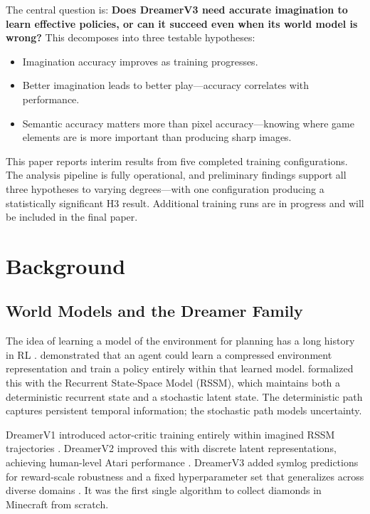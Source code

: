 \documentclass[letterpaper]{article}
\begin{document}
The central question is: \textbf{Does DreamerV3 need accurate imagination to learn effective policies, or can it succeed even when its world model is wrong?} This decomposes into three testable hypotheses:
\begin{itemize}
    \item[\textbf{H1:}] Imagination accuracy improves as training progresses.
    \item[\textbf{H2:}] Better imagination leads to better play---accuracy correlates with performance.
    \item[\textbf{H3:}] Semantic accuracy matters more than pixel accuracy---knowing where game elements are is more important than producing sharp images.
\end{itemize}

This paper reports interim results from five completed training configurations. The analysis pipeline is fully operational, and preliminary findings support all three hypotheses to varying degrees---with one configuration producing a statistically significant H3 result. Additional training runs are in progress and will be included in the final paper.


\section{Background}

\subsection{World Models and the Dreamer Family}

The idea of learning a model of the environment for planning has a long history in RL \citep{sutton2018rl}. \citet{ha2018world} demonstrated that an agent could learn a compressed environment representation and train a policy entirely within that learned model. \citet{hafner2019planet} formalized this with the Recurrent State-Space Model (RSSM), which maintains both a deterministic recurrent state and a stochastic latent state. The deterministic path captures persistent temporal information; the stochastic path models uncertainty.

DreamerV1 introduced actor-critic training entirely within imagined RSSM trajectories \citep{hafner2020dreamerv1}. DreamerV2 improved this with discrete latent representations, achieving human-level Atari performance \citep{hafner2021dreamerv2}. DreamerV3 added symlog predictions for reward-scale robustness and a fixed hyperparameter set that generalizes across diverse domains \citep{hafner2025dreamerv3}. It was the first single algorithm to collect diamonds in Minecraft from scratch.
\end{document}
